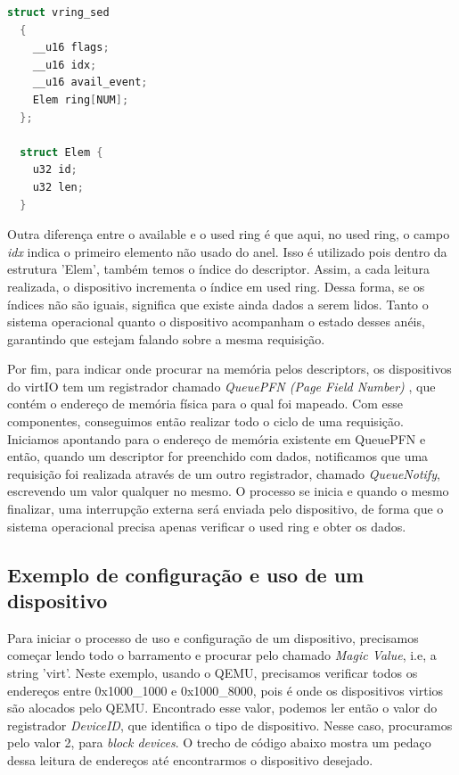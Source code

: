 \begin{lstlisting}[language=C]
  struct vring_sed
  {
    __u16 flags;
    __u16 idx;
    __u16 avail_event;
    Elem ring[NUM];
  };

  struct Elem {
    u32 id;
    u32 len;
  }
\end{lstlisting}


Outra diferença entre o available e o used ring é que aqui, no used ring, o campo \emph{idx} indica o primeiro elemento não usado do anel.
Isso é utilizado pois dentro da estrutura 'Elem', também temos o índice do descriptor. Assim, a cada leitura realizada, o dispositivo incrementa o índice em used ring.
Dessa forma, se os índices não são iguais, significa que existe ainda dados a serem lidos. 	Tanto o sistema operacional quanto o dispositivo acompanham o estado desses anéis, garantindo que estejam falando sobre a mesma requisição.


Por fim, para indicar onde procurar na memória pelos descriptors, os dispositivos do virtIO tem um registrador chamado \emph{QueuePFN (Page Field Number)} , que contém o endereço de memória física para o qual foi mapeado. Com esse componentes, conseguimos então realizar todo o ciclo de uma requisição. Iniciamos apontando para o endereço de memória existente em QueuePFN e então, quando um descriptor for preenchido com dados, notificamos que uma requisição foi realizada através de um outro registrador, chamado \emph{QueueNotify}, escrevendo um valor qualquer no mesmo. O processo se inicia e quando o mesmo finalizar, uma interrupção externa será enviada pelo dispositivo, de forma que o sistema operacional precisa apenas verificar o used ring e obter os dados.


\subsection{Exemplo de configuração e uso de um dispositivo}

Para iniciar o processo de uso e configuração de um dispositivo, precisamos começar lendo todo o barramento e procurar pelo chamado \emph{Magic Value}, i.e, a string 'virt'.
Neste exemplo, usando o QEMU, precisamos verificar todos os endereços entre 0x1000{\_}1000 e 0x1000{\_}8000, pois é onde os dispositivos virtios são alocados pelo QEMU.
Encontrado esse valor, podemos ler então o valor do registrador \emph{DeviceID}, que identifica o tipo de dispositivo. Nesse caso, procuramos pelo valor 2, para \emph{block devices}.
O trecho de código abaixo mostra um pedaço dessa leitura de endereços até encontrarmos o dispositivo desejado.

